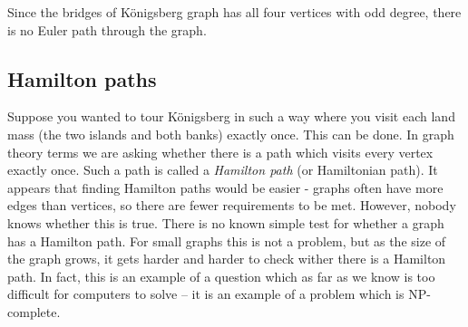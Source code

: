 \documentclass[12pt]{article}
\begin{document}
Since the bridges of K\"onigsberg graph has all four vertices with odd degree, there is no Euler path through the graph.

\subsection{Hamilton paths}

Suppose you wanted to tour K\"onigsberg in such a way where you visit each land mass (the two islands and both banks) exactly once.  This can be done.  In graph theory terms we are asking whether there is a path which visits every vertex exactly once.  Such a path is called a {\em Hamilton path} (or Hamiltonian path).  It appears that finding Hamilton paths would be easier - graphs often have more edges than vertices, so there are fewer requirements to be met.  However, nobody knows whether this is true.  There is no known simple test for whether a graph has a Hamilton path.  For small graphs this is not a problem, but as the size of the graph grows, it gets harder and harder to check wither there is a Hamilton path.  In fact, this is an example of a question which as far as we know is too difficult for computers to solve -- it is an example of a problem which is NP-complete.  
\end{document}
